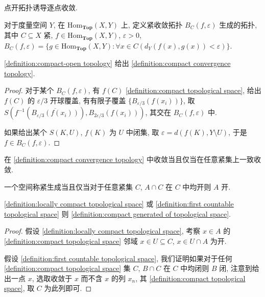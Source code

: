 \begin{lemma}
    点开拓扑诱导逐点收敛.
\end{lemma}

\begin{definition}[紧收敛拓扑]
    \label {definition:compact convergence topology}
    对于度量空间 \(Y\), 在 \(\mathrm{Hom}_{\mathbf{Top}} (X,Y)\) 上, 定义紧收敛拓扑 \(B_C (f,\varepsilon)\) 生成的拓扑,
    其中 \(C \subseteq X\) 紧, \(f \in \mathrm{Hom}_{\mathbf{Top}} (X,Y)\), \(\varepsilon > 0\), \(B_C (f,\varepsilon) = \{g \in \mathrm{Hom}_{\mathbf{Top}} (X,Y) : \forall x \in C (d_Y (f(x),g(x)) < \varepsilon)\}\).
\end{definition}

\begin{lemma}
    \ref{definition:compact-open topology} 给出 \ref{definition:compact convergence topology}.

    \begin{proof}
        对于某个 \(B_C (f,\varepsilon)\), 有 \(f(C)\) \ref{definition:compact topological space},
        给出 \(f(C)\) 的 \(\varepsilon/3\) 开球覆盖, 有有限子覆盖 \(\{B_{\varepsilon/3} (f(x_i))\}\),
        取 \(S(f^{-1} (\overline{B_{\varepsilon/3} (f(x_i))}),B_{2 \varepsilon/3} (f(x_i)))\), 其交在 \(B_C (f,\varepsilon)\) 中.

        如果给出某个 \(S(K,U)\), \(f(K)\) 为 \(U\) 中闭集, 取 \(\varepsilon = d (f(K),Y \setminus U)\), 于是 \(f \in B_C (f,\varepsilon)\).
    \end{proof}
\end{lemma}

\begin{lemma}
    在 \ref{definition:compact convergence topology} 中收敛当且仅当在任意紧集上一致收敛.
\end{lemma}

\begin{definition}[紧生成]
    \label {definition:compact generated of topological space}
    一个空间称紧生成当且仅当对于任意紧集 \(C\), \(A \cap C\) 在 \(C\) 中均开则 \(A\) 开.
\end{definition}

\begin{lemma}
    \ref{definition:locally compact topological space} 或 \ref{definition:first countable topological space} 则 \ref{definition:compact generated of topological space}.

    \begin{proof}
        假设 \ref{definition:locally compact topological space}, 考察 \(x \in A\) 的 \ref{definition:compact topological space} 邻域 \(x \in U \subseteq C\), \(x \in U \cap A\) 为开.

        假设 \ref{definition:first countable topological space}, 我们证明如果对于任何 \ref{definition:compact topological space} 集 \(C\), \(B \cap C\) 在 \(C\) 中均闭则 \(B\) 闭,
        注意到给出一点 \(x\), 选取收敛于 \(x\) 而不含 \(x\) 的列 \(x_n\), 其 \ref{definition:compact topological space}, 取 \(C\) 为此列即可.
    \end{proof}
\end{lemma}

